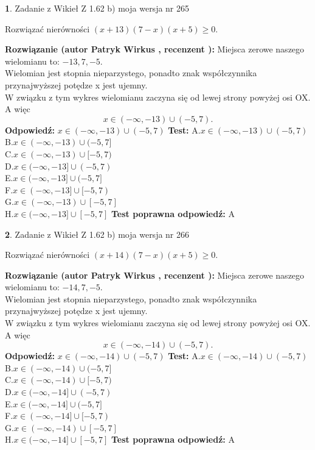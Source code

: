 \documentclass[12pt, a4paper]{article}
\theoremstyle{definition} %
\newtheorem{zad}{}
\newcommand{\zadStart}[1]{\begin{zad}#1\newline}
\newcommand{\zadStop}{\end{zad}}
\newcommand{\rozwStart}[2]{\noindent \textbf{Rozwiązanie (autor #1 , recenzent #2): }\newline}
\newcommand{\rozwStop}{\newline}
\newcommand{\odpStart}{\noindent \textbf{Odpowiedź:}\newline}
\newcommand{\odpStop}{\newline}
\newcommand{\testStart}{\noindent \textbf{Test:}\newline}
\newcommand{\testStop}{\newline}
\newcommand{\kluczStart}{\noindent \textbf{Test poprawna odpowiedź:}\newline}
\newcommand{\kluczStop}{\newline}
\begin{document}
\zadStart{Zadanie z Wikieł Z 1.62 b) moja wersja nr 265}

Rozwiązać nierówności $(x+13)(7-x)(x+5)\ge0$.
\zadStop
\rozwStart{Patryk Wirkus}{}
Miejsca zerowe naszego wielomianu to: $-13, 7, -5$.\\
Wielomian jest stopnia nieparzystego, ponadto znak współczynnika przy\linebreak najwyższej potędze x jest ujemny.\\ W związku z tym wykres wielomianu zaczyna się od lewej strony powyżej osi OX. A więc $$x \in (-\infty,-13) \cup (-5,7).$$
\rozwStop
\odpStart
$x \in (-\infty,-13) \cup (-5,7)$
\odpStop
\testStart
A.$x \in (-\infty,-13) \cup (-5,7)$\\
B.$x \in (-\infty,-13) \cup (-5,7]$\\
C.$x \in (-\infty,-13) \cup [-5,7)$\\
D.$x \in (-\infty,-13] \cup (-5,7)$\\
E.$x \in (-\infty,-13] \cup (-5,7]$\\
F.$x \in (-\infty,-13] \cup [-5,7)$\\
G.$x \in (-\infty,-13) \cup [-5,7]$\\
H.$x \in (-\infty,-13] \cup [-5,7]$
\testStop
\kluczStart
A
\kluczStop



\zadStart{Zadanie z Wikieł Z 1.62 b) moja wersja nr 266}

Rozwiązać nierówności $(x+14)(7-x)(x+5)\ge0$.
\zadStop
\rozwStart{Patryk Wirkus}{}
Miejsca zerowe naszego wielomianu to: $-14, 7, -5$.\\
Wielomian jest stopnia nieparzystego, ponadto znak współczynnika przy\linebreak najwyższej potędze x jest ujemny.\\ W związku z tym wykres wielomianu zaczyna się od lewej strony powyżej osi OX. A więc $$x \in (-\infty,-14) \cup (-5,7).$$
\rozwStop
\odpStart
$x \in (-\infty,-14) \cup (-5,7)$
\odpStop
\testStart
A.$x \in (-\infty,-14) \cup (-5,7)$\\
B.$x \in (-\infty,-14) \cup (-5,7]$\\
C.$x \in (-\infty,-14) \cup [-5,7)$\\
D.$x \in (-\infty,-14] \cup (-5,7)$\\
E.$x \in (-\infty,-14] \cup (-5,7]$\\
F.$x \in (-\infty,-14] \cup [-5,7)$\\
G.$x \in (-\infty,-14) \cup [-5,7]$\\
H.$x \in (-\infty,-14] \cup [-5,7]$
\testStop
\kluczStart
A
\kluczStop
\end{document}
